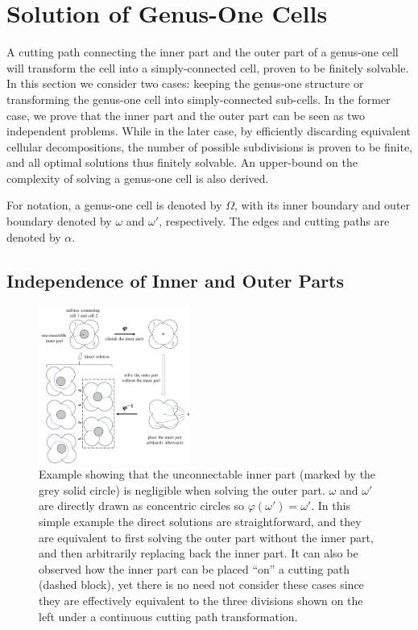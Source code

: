 \documentclass[journal]{IEEEtran}
\begin{document}
\section{Solution of Genus-One Cells}
\label{section_genus_one}
A cutting path connecting the inner part and the outer part of a genus-one cell will transform the cell into a 
simply-connected cell, %
proven to be finitely solvable. 
In this section we consider two cases: keeping the genus-one structure or transforming the genus-one cell into 
simply-connected sub-cells. In the former case, we prove that the inner part and the outer part can be seen as two independent problems. 
While in the later case, by efficiently discarding equivalent cellular decompositions, the number of possible subdivisions is proven to be finite, 
and all optimal solutions thus finitely solvable. An upper-bound on the complexity of solving a genus-one cell is also derived.  

For notation, a genus-one cell is denoted by $\Omega$, with its inner boundary and outer boundary denoted by $\omega$ and $\omega'$, 
respectively. The edges and cutting paths are denoted by $\alpha$. 

\subsection{Independence of Inner and Outer Parts}
\label{subsection_un_inner_cell}
\begin{figure}[t]
\centering
\includegraphics[width = 0.44\textwidth]{figures/proof/fig_physical_hole_5}
\caption{Example showing that the unconnectable inner part (marked by the grey solid circle) is negligible when solving the outer part. 
$\omega$ and $\omega'$ are directly drawn as concentric circles so $\varphi(\omega') = \omega'$. 
In this simple example the direct solutions are straightforward, and they are equivalent to first solving the outer part without the inner part, 
and then arbitrarily replacing back the inner part. It can also be observed how the inner part can be placed ``on'' a cutting path 
(dashed block), yet there is no need not consider these cases since they are effectively equivalent to the three divisions shown on the left under 
a continuous cutting path transformation.}
 \label{fig_physical_hole}
\end{figure}
\end{document}
